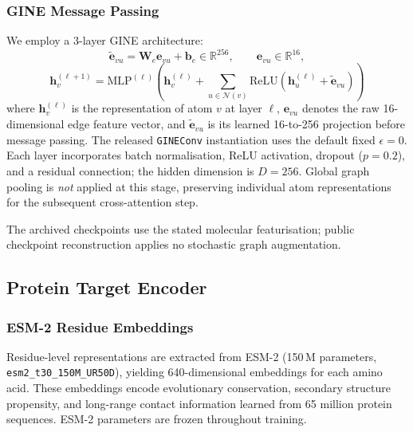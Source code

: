 \documentclass[fleqn,10pt]{wlscirep}
\begin{document}
\subsubsection{GINE Message Passing}

We employ a 3-layer GINE
architecture:\cite{hu2020strategies}
\begin{equation}
\widetilde{\mathbf{e}}_{vu}=\mathbf{W}_e\mathbf{e}_{vu}+\mathbf{b}_e
\in\mathbb{R}^{256},\qquad \mathbf{e}_{vu}\in\mathbb{R}^{16},
\label{eq:edge_projection}
\end{equation}
\begin{equation}
\mathbf{h}_v^{(\ell+1)} = \mathrm{MLP}^{(\ell)}\!\left(
  \mathbf{h}_v^{(\ell)} +
  \sum_{u\in\mathcal{N}(v)}
  \mathrm{ReLU}\!\left(\mathbf{h}_u^{(\ell)} + \widetilde{\mathbf{e}}_{vu}\right)
\right)
\end{equation}
where $\mathbf{h}_v^{(\ell)}$ is the representation of atom $v$ at layer $\ell$,
$\mathbf{e}_{vu}$ denotes the raw 16-dimensional edge feature vector, and
$\widetilde{\mathbf{e}}_{vu}$ is its learned 16-to-256 projection before message
passing. The released \texttt{GINEConv} instantiation uses the default fixed
$\epsilon=0$. Each layer incorporates batch normalisation, ReLU activation,
dropout ($p=0.2$), and a residual connection; the hidden dimension is $D=256$.
Global graph pooling is \emph{not} applied at this stage, preserving individual
atom representations for the subsequent cross-attention step.

The archived checkpoints use the stated molecular featurisation; public
checkpoint reconstruction applies no stochastic graph augmentation.

\subsection{Protein Target Encoder}

\subsubsection{ESM-2 Residue Embeddings}

Residue-level representations are extracted from ESM-2 (150\,M parameters,
\texttt{esm2\_t30\_150M\_UR50D}),\cite{lin2023evolutionary} yielding
640-dimensional embeddings for each amino acid.  These embeddings encode
evolutionary conservation, secondary structure propensity, and long-range contact
information learned from 65 million protein sequences.  ESM-2 parameters are
frozen throughout training.
\end{document}
